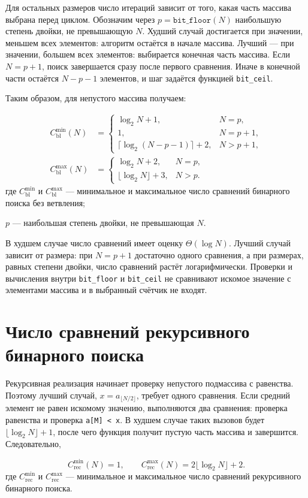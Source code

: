 Для остальных размеров число итераций зависит от того, какая часть массива выбрана перед циклом. Обозначим через $p=\texttt{bit\_floor}(N)$ наибольшую степень двойки, не превышающую $N$. Худший случай достигается при значении, меньшем всех элементов: алгоритм остаётся в начале массива. Лучший --- при значении, большем всех элементов: выбирается конечная часть массива. Если $N=p+1$, поиск завершается сразу после первого сравнения. Иначе в конечной части остаётся $N-p-1$ элементов, и шаг задаётся функцией \texttt{bit\_ceil}.

Таким образом, для непустого массива получаем:
\begin{samepage}
\begin{equation}\label{eq:branchcount}
\begin{aligned}
 C_{\mathrm{bl}}^{\min}(N)&=\begin{cases}
 \log_2N+1,&N=p,\\
 1,&N=p+1,\\
 \lceil\log_2(N-p-1)\rceil+2,&N>p+1,
 \end{cases}\\[2mm]
 C_{\mathrm{bl}}^{\max}(N)&=\begin{cases}
 \log_2N+2,&N=p,\\
 \lfloor\log_2N\rfloor+3,&N>p.
 \end{cases}
\end{aligned}
\end{equation}
\indent где $C_{\mathrm{bl}}^{\min}$ и $C_{\mathrm{bl}}^{\max}$ --- минимальное и максимальное число сравнений бинарного поиска без ветвления;\par
\noindent $p$ --- наибольшая степень двойки, не превышающая $N$.
\end{samepage}

В худшем случае число сравнений имеет оценку $\Theta(\log N)$. Лучший случай зависит от размера: при $N=p+1$ достаточно одного сравнения, а при размерах, равных степени двойки, число сравнений растёт логарифмически. Проверки и вычисления внутри \texttt{bit\_floor} и \texttt{bit\_ceil} не сравнивают искомое значение с элементами массива и в выбранный счётчик не входят.

\section{Число сравнений рекурсивного бинарного поиска}
Рекурсивная реализация начинает проверку непустого подмассива с равенства. Поэтому лучший случай, $x=a_{\lfloor N/2\rfloor}$, требует одного сравнения. Если средний элемент не равен искомому значению, выполняются два сравнения: проверка равенства и проверка \texttt{a[M] < x}. В худшем случае таких вызовов будет $\lfloor\log_2N\rfloor+1$, после чего функция получит пустую часть массива и завершится. Следовательно,
\begin{samepage}
\begin{equation}\label{eq:reccount}
 C_{\mathrm{rec}}^{\min}(N)=1,\qquad C_{\mathrm{rec}}^{\max}(N)=2\lfloor\log_2N\rfloor+2.
\end{equation}
\indent где $C_{\mathrm{rec}}^{\min}$ и $C_{\mathrm{rec}}^{\max}$ --- минимальное и максимальное число сравнений рекурсивного бинарного поиска.
\end{samepage}

